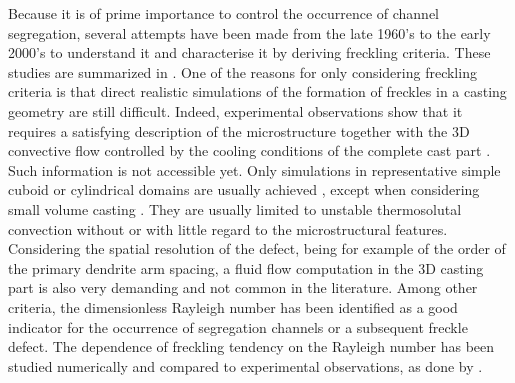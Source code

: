 Because it is of prime importance to control the occurrence of channel segregation, several attempts have been made 
from the late 1960’s \citep{flemings_macrosegregation:_1967, flemings_macrosegregation:_1968-1,flemings_macrosegregation:_1968} 
to the early 2000’s \citep{ramirez_evaluation_2003} to understand it and characterise it by deriving freckling criteria. 
These studies are summarized in \citep{auburtin_determination_1998}. One of the reasons for only considering freckling criteria 
is that direct realistic simulations of the formation of freckles in a casting geometry are still difficult. 
Indeed, experimental observations show that it requires a satisfying description of the microstructure together 
with the 3D convective flow controlled by the cooling conditions of the complete cast part \citep{shevchenko_chimney_2013}. 
Such information is not accessible yet. Only simulations in representative simple cuboid or cylindrical domains are 
usually achieved \citep{felicelli_simulation_1991,felicelli_modeling_1998,kohler_peritectic_2008,guo_three-dimensional_2003}, 
except when considering small volume casting \citep{desbiolles_micro-macrosegregation_2003}. 
They are usually limited to unstable thermosolutal convection without or with 
little regard to the microstructural features. Considering the spatial resolution of the defect, being for example of the 
order of the primary dendrite arm spacing, a fluid flow computation in the 3D casting part is also very demanding and not 
common in the literature. 
Among  other criteria, the dimensionless Rayleigh number has been identified as a good indicator 
for  the occurrence of segregation channels or a subsequent freckle defect. The dependence of freckling tendency on the 
Rayleigh number has been studied numerically 
and compared to experimental observations, as done by \citep{ramirez_evaluation_2003}.
